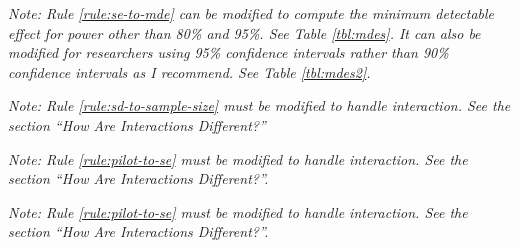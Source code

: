 \documentclass[12pt]{article}
\begin{document}


{\noindent \footnotesize \textit{Note: Rule \ref{rule:se-to-mde} can be modified to compute the minimum detectable effect for power other than 80\% and 95\%. See Table \ref{tbl:mdes}. It can also be modified for researchers using 95\% confidence intervals rather than 90\% confidence intervals as I recommend. See Table \ref{tbl:mdes2}.}}


{\noindent \footnotesize \textit{Note: Rule \ref{rule:sd-to-sample-size} must be modified to handle interaction. See the section ``How Are Interactions Different?''}}

{}
{}

{\noindent \footnotesize \textit{Note: Rule \ref{rule:pilot-to-se} must be modified to handle interaction. See the section ``How Are Interactions Different?''.}}


{\noindent \footnotesize \textit{Note: Rule \ref{rule:pilot-to-se} must be modified to handle interaction. See the section ``How Are Interactions Different?''.}}

\end{document}
